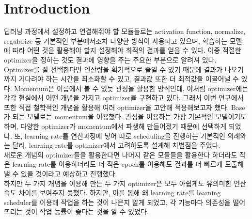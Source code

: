 \documentclass{article}
\begin{document}
\section{Introduction}
딥러닝 과정에서 설정하고 연결해줘야 할 모듈들로는 activation function, normalize, regularize 등 기본적인 부분에서조차 다양한 방식이 사용되고 있으며, 학습하는 모델에 따라 어떤 것을 활용해야 할지 설정해야 최적의 결과를 얻을 수 있다. 이중 적절한 optimizer을 정하는 것도 결과에 영향을 주는 주요한 부분으로 알려져 있다. Optimizer를 잘 선택한다면 연산량을 획기적으로 줄일 수 있기 때문에 결과가 나오기까지 기다려야 하는 시간을 최소화할 수 있고, 결과값 또한 더 최적값을 이끌어낼 수 있다. Momentum은 이름에서 볼 수 있듯 관성을 활용한 방식인데, 이처럼 optimizer에는 각각 현실에서 어떤 개념을 가지고 optimizer을 구현하고 있다. 그래서 이번 연구에서 또한 직접 철학적인 개념을 활용해 여러 optimizer을 고안해 적용해보고자 했다.
Base가 되는 모델로는 momentum을 이용했다. 관성을 이용하는 가장 기본적인 모델이기도 하며, 다양한 optimizer가 momentum에서 파생해 만들어졌기 때문에 선택하게 되었다. 또, learning rate를 연산과정에 넣어 따로 scheduling을 진행하는 기본적인 의례와는 달리, learning rate를 optimizer에서 고려하도록 설계해 차별점을 주었다.\\
새로운 개념의 optimizer들을 활용한다면 나머지 같은 모듈들을 활용한다 하더라도 작은 learning rate를 이용하더라도 더 적은 epoch를 이용해도 결과를 더 빠르게 도출해낼 수 있을 것이라고 예상하고 진행했다.\\
하지만 두 가지 개념을 이용해 만든 두 가지 optimizer은 모두 아쉽게도 유의미한 연산 속도 차이를 보여주지 못했다. 하지만, 이를 통해 왜 learning rate를 learning scheduler를 이용해 작업을 하는 것이 나은지 알게 되었고, 각 기능마다 의존성을 떨어뜨리는 것이 작업 능률이 좋다는 것을 알 수 있었다.
\end{document}
